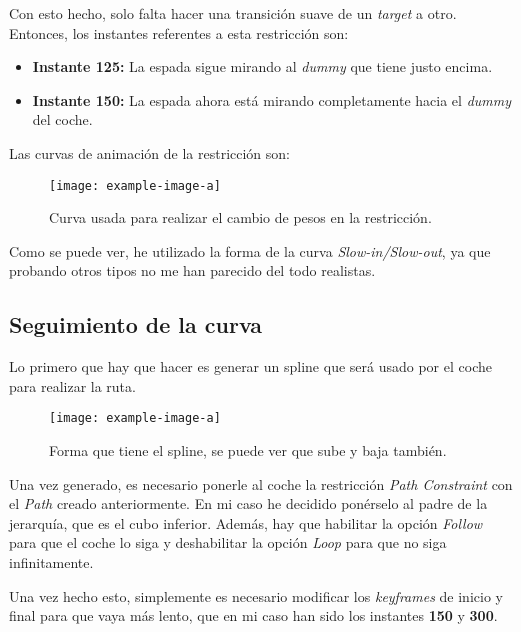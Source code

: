 Con esto hecho, solo falta hacer una transición suave de un \textit{target} a otro. Entonces, los instantes referentes a esta restricción son:

\begin{itemize}
    \item \textbf{Instante 125: }La espada sigue mirando al \textit{dummy} que tiene justo encima.
    \item \textbf{Instante 150: }La espada ahora está mirando completamente hacia el \textit{dummy} del coche.
\end{itemize}

Las curvas de animación de la restricción son:

\begin{figure}[H]
    \centering
   \texttt{[image: example-image-a]}
   \caption{Curva usada para realizar el cambio de pesos en la restricción.}
\end{figure}


Como se puede ver, he utilizado la forma de la curva \textit{Slow-in/Slow-out}, ya que probando otros tipos no me han parecido del todo realistas.

\subsection{Seguimiento de la curva}

Lo primero que hay que hacer es generar un spline que será usado por el coche para realizar la ruta.

\begin{figure}[H]
    \centering
   \texttt{[image: example-image-a]}
   \caption{Forma que tiene el spline, se puede ver que sube y baja también.}
\end{figure}

Una vez generado, es necesario ponerle al coche la restricción \textit{Path Constraint} con el \textit{Path} creado anteriormente. En mi caso he decidido ponérselo al padre de la jerarquía, que es el cubo inferior. Además, hay que habilitar la opción \textit{Follow} para que el coche lo siga y deshabilitar la opción \textit{Loop} para que no siga infinitamente.

\bigskip

Una vez hecho esto, simplemente es necesario modificar los \textit{keyframes} de inicio y final para que vaya más lento, que en mi caso han sido los instantes \textbf{150} y \textbf{300}.

